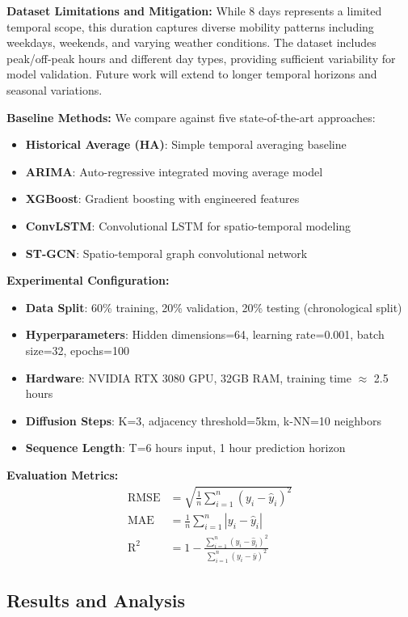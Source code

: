 \documentclass[twocolumn,11pt]{IEEEtran}
\begin{document}
\textbf{Dataset Limitations and Mitigation:}
While 8 days represents a limited temporal scope, this duration captures diverse mobility patterns including weekdays, weekends, and varying weather conditions. The dataset includes peak/off-peak hours and different day types, providing sufficient variability for model validation. Future work will extend to longer temporal horizons and seasonal variations.

\textbf{Baseline Methods:}
We compare against five state-of-the-art approaches:
\begin{itemize}
\item \textbf{Historical Average (HA)}: Simple temporal averaging baseline
\item \textbf{ARIMA}: Auto-regressive integrated moving average model
\item \textbf{XGBoost}: Gradient boosting with engineered features \cite{chen2016}
\item \textbf{ConvLSTM}: Convolutional LSTM for spatio-temporal modeling \cite{xingjian2015}
\item \textbf{ST-GCN}: Spatio-temporal graph convolutional network \cite{yu2018}
\end{itemize}

\textbf{Experimental Configuration:}
\begin{itemize}
\item \textbf{Data Split}: 60\% training, 20\% validation, 20\% testing (chronological split)
\item \textbf{Hyperparameters}: Hidden dimensions=64, learning rate=0.001, batch size=32, epochs=100
\item \textbf{Hardware}: NVIDIA RTX 3080 GPU, 32GB RAM, training time $\approx$ 2.5 hours
\item \textbf{Diffusion Steps}: K=3, adjacency threshold=5km, k-NN=10 neighbors
\item \textbf{Sequence Length}: T=6 hours input, 1 hour prediction horizon
\end{itemize}

\textbf{Evaluation Metrics:}
\begin{align}
\text{RMSE} &= \sqrt{\frac{1}{n}\sum_{i=1}^{n}(y_i - \hat{y}_i)^2} \\
\text{MAE} &= \frac{1}{n}\sum_{i=1}^{n}|y_i - \hat{y}_i| \\
\text{R}^2 &= 1 - \frac{\sum_{i=1}^{n}(y_i - \hat{y}_i)^2}{\sum_{i=1}^{n}(y_i - \bar{y})^2}
\end{align}

\subsection{Results and Analysis}
\end{document}
